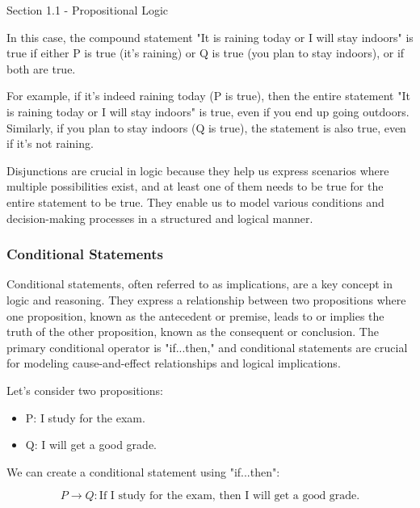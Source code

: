 \begin{notes}{Section 1.1 - Propositional Logic}
\begin{highlight}
        In this case, the compound statement "It is raining today or I will stay indoors" is true if either P is true (it's raining) or Q is true (you plan to stay indoors), or if both are true.

        For example, if it's indeed raining today (P is true), then the entire statement "It is raining today or I will stay indoors" is true, even if you end up going outdoors. Similarly, if you plan to stay 
        indoors (Q is true), the statement is also true, even if it's not raining.
    \end{highlight}

    Disjunctions are crucial in logic because they help us express scenarios where multiple possibilities exist, and at least one of them needs to be true for the entire statement to be true. They enable us to 
    model various conditions and decision-making processes in a structured and logical manner.

    \subsubsection*{Conditional Statements}

    Conditional statements, often referred to as implications, are a key concept in logic and reasoning. They express a relationship between two propositions where one proposition, known as the antecedent or premise, 
    leads to or implies the truth of the other proposition, known as the consequent or conclusion. The primary conditional operator is "if...then," and conditional statements are crucial for modeling cause-and-effect 
    relationships and logical implications.

    \begin{highlight}
        Let's consider two propositions:

        \begin{itemize}
            \item P: I study for the exam.
            \item Q: I will get a good grade.
        \end{itemize}

        We can create a conditional statement using "if...then":

        \begin{equation}
            P \rightarrow Q: \text{If I study for the exam, then I will get a good grade.}
        \end{equation}


\end{highlight}
\end{notes}
